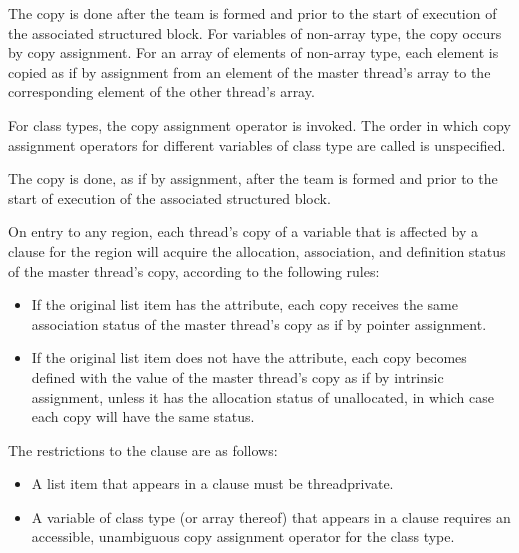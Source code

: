 {{{{\descr
\ccppspecificstart
The copy is done after the team is formed and prior to the start of execution of the 
associated structured block. For variables of non-array type, the copy occurs by copy 
assignment. For an array of elements of non-array type, each element is copied as if by 
assignment from an element of the master thread’s array to the corresponding element of 
the other thread’s array. 
\ccppspecificend

\cppspecificstart
For class types, the copy assignment operator is invoked. The order in which copy 
assignment operators for different variables of class type are called is unspecified. 
\cppspecificend

\fortranspecificstart
The copy is done, as if by assignment, after the team is formed and prior to the start of 
execution of the associated structured block.

On entry to any  region, each thread’s copy of a variable that is affected by 
a  clause for the  region will acquire the allocation, association, and 
definition status of the master thread’s copy, according to the following rules:

\begin{itemize}
\item If the original list item has the  attribute, each copy receives the same 
association status of the master thread’s copy as if by pointer assignment.

\item If the original list item does not have the  attribute, each copy becomes 
defined with the value of the master thread's copy as if by intrinsic assignment, 
unless it has the allocation status of unallocated, in which case each copy
will have the same status.
\end{itemize}
\fortranspecificend

\restrictions
The restrictions to the  clause are as follows:
\ccppspecificstart
\begin{itemize}
\item A list item that appears in a  clause must be threadprivate.

\item A variable of class type (or array thereof) that appears in a  clause requires 
an accessible, unambiguous copy assignment operator for the class type.
\end{itemize}
\ccppspecificend

}}}}
